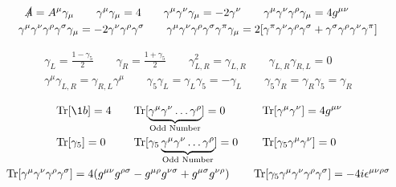 \begin{gather*}
    \slashed{A} = A^\mu\gamma_\mu
    \qquad
    \gamma^\mu\gamma_\mu = 4
    \qquad
    \gamma^\mu\gamma^\nu\gamma_\mu = -2\gamma^\nu
    \qquad
    \gamma^\mu\gamma^\nu\gamma^\rho\gamma_\mu = 4g^{\mu\nu}
    \qquad
    \\
    \gamma^\mu\gamma^\nu\gamma^\rho\gamma^\sigma\gamma_\mu = -2\gamma^\nu\gamma^\rho\gamma^\sigma
    \qquad
    \gamma^\mu\gamma^\nu\gamma^\rho\gamma^\sigma\gamma^\pi\gamma_\mu = 2\qty[\gamma^\pi\gamma^\nu\gamma^\rho\gamma^\sigma + \gamma^\sigma\gamma^\rho\gamma^\nu\gamma^\pi]
\end{gather*}

\begin{gather*}
    \gamma_L = \frac{1 - \gamma_5}{2}
    \qquad
    \gamma_R = \frac{1 + \gamma_5}{2}
    \qquad
    \gamma_{L,R}^2 = \gamma_{L,R}
    \qquad
    \gamma_{L,R}\gamma_{R,L} = 0
    \\
    \gamma^\mu\gamma_{L,R} = \gamma_{R,L}\gamma^\mu
    \qquad
    \gamma_5\gamma_{L} = \gamma_{L}\gamma_5 = -\gamma_{L}
    \qquad
    \gamma_5\gamma_{R} = \gamma_{R}\gamma_5 = \gamma_{R}
\end{gather*}

\begin{gather*}
    \begin{alignedat}{3}
        &\Tr[\1b] = 4
        \qquad
        &&\mathrm{Tr}[\underbrace{\gamma^\mu\gamma^\nu\dots\gamma^\rho}_{\mathclap{\text{Odd Number}}}] = 0
        \qquad
        &&\Tr[\gamma^\mu\gamma^\nu] = 4g^{\mu\nu}
        \\
        &\Tr[\gamma_5] = 0
        \qquad
        &&\mathrm{Tr}[\gamma_5\underbrace{\gamma^\mu\gamma^\nu\dots\gamma^\rho}_{\mathclap{\text{Odd Number}}}] = 0
        \qquad
        &&\Tr[\gamma_5\gamma^\mu\gamma^\nu] = 0
    \end{alignedat}
    \\
    \Tr[\gamma^\mu\gamma^\nu\gamma^\rho\gamma^\sigma] = 4\qty(g^{\mu\nu}g^{\rho\sigma} - g^{\mu\rho}g^{\nu\sigma} + g^{\mu\sigma}g^{\nu\rho})
    \qquad
    \Tr[\gamma_5\gamma^\mu\gamma^\nu\gamma^\rho\gamma^\sigma] = -4i\epsilon^{\mu\nu\rho\sigma}
\end{gather*}

